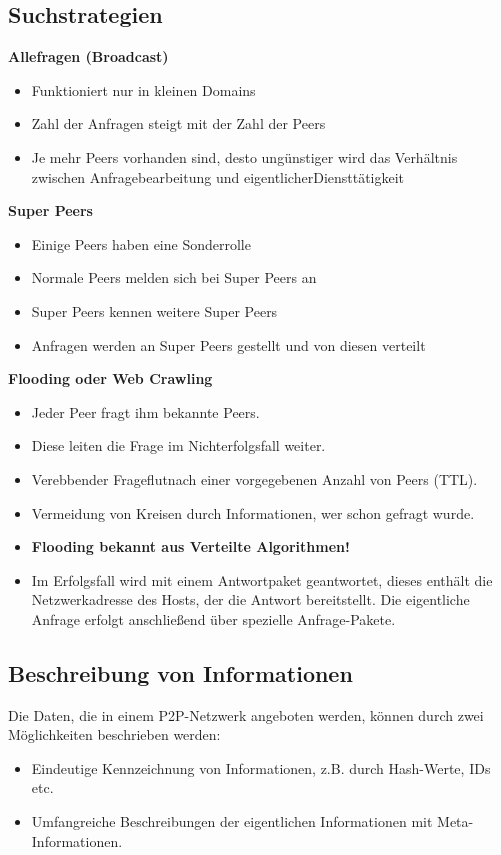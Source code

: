 \documentclass{article} %
\begin{document}
\subsection{Suchstrategien}
\textbf{\glqq Alle\grqq fragen (Broadcast)}
	\begin{itemize}
	\item Funktioniert nur in kleinen Domains 
	\item Zahl der Anfragen steigt mit der Zahl der Peers 
	\item Je mehr Peers vorhanden sind, desto ungünstiger wird das Verhältnis zwischen Anfragebearbeitung und \glqq eigentlicher\grqq Diensttätigkeit 
	\end{itemize}
\textbf{Super Peers}
	\begin{itemize}
	\item Einige Peers haben eine Sonderrolle 
	\item Normale Peers melden sich bei Super Peers an 
	\item Super Peers kennen weitere Super Peers 
	\item Anfragen werden an Super Peers gestellt und von diesen verteilt 
	\end{itemize}
\textbf{Flooding oder Web Crawling}
	\begin{itemize}
	\item Jeder Peer fragt ihm bekannte Peers. 
	\item Diese leiten die Frage im Nichterfolgsfall weiter. 
	\item \glqq Verebben\grqq der \glqq Frageflut\grqq nach einer vorgegebenen Anzahl von Peers (TTL). 
	\item Vermeidung von Kreisen durch Informationen, wer schon gefragt wurde. 
	\item \textbf{Flooding bekannt aus Verteilte Algorithmen!}
	\item Im Erfolgsfall wird mit einem Antwortpaket geantwortet, dieses enthält die Netzwerkadresse des Hosts, der die Antwort bereitstellt. Die eigentliche Anfrage erfolgt anschließend über spezielle Anfrage-Pakete.	
	\end{itemize}
	
\subsection{Beschreibung von Informationen}
Die Daten, die in einem P2P-Netzwerk angeboten werden, können durch zwei Möglichkeiten beschrieben werden:
	\begin{itemize}
	\item Eindeutige Kennzeichnung von Informationen, z.B. durch Hash-Werte, IDs etc.
	\item Umfangreiche Beschreibungen der eigentlichen Informationen mit Meta-Informationen. 
	\end{itemize}
\end{document}
